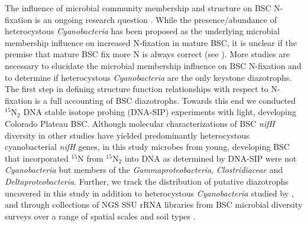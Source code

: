 The influence of microbial community membership and structure on BSC N-fixation
is an ongoing research question \citep{Belnap28062013}. While the
presence/abundance of heterocystous \textit{Cyanobacteria} has been proposed as
the underlying microbial membership influence on increased N-fixation in mature
BSC, it is unclear if the premise that mature BSC fix more N is always correct
(see \citet{15643930}). More studies are necessary to elucidate the microbial
membership influence on BSC N-fixation and to determine if heterocystous
\textit{Cyanobacteria} are the only keystone diazotrophs. The first step in
defining structure function relationships with respect to N-fixation is a full
accounting of BSC diazotrophs. Towards this end we conducted $^{15}$N$_{2}$ DNA
stable isotope probing (DNA-SIP) experiments with light, developing Colorado
Plateau BSC.  Although molecular characterizations of BSC \textit{nifH}
diversity in other studies have yielded predominantly heterocystous
cyanobacterial \textit{nifH} genes, in this study microbes from young,
developing BSC that incorporated $^{15}$N from $^{15}$N$_{2}$ into DNA as
determined by DNA-SIP were not \textit{Cyanobacteria} but members of the
\textit{Gammaproteobacteria}, \textit{Clostridiaceae} and
\textit{Deltaproteobacteria}. Further, we track the distribution of putative
diazotrophs uncovered in this study in addition to heterocystous
\textit{Cyanobacteria} studied by \citet{14766579}, \citet{Yeager} and
\citet{Yeager_2012} through collections of NGS SSU rRNA libraries from BSC
microbial diversity surveys over a range of spatial scales and soil types
\citep{Garcia_Pichel_2013, Steven_2013}. 
